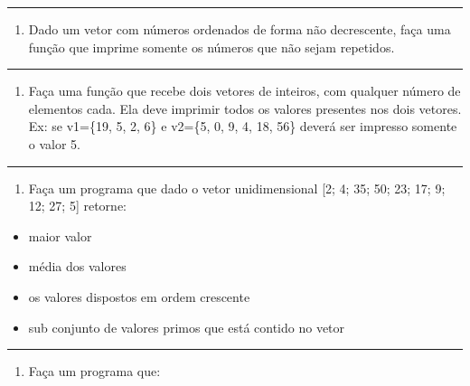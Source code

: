 \documentclass[12pt,a4paper]{article}
\renewcommand{\linethickness}{0.05em}
\providecommand{\tightlist}{%
      \setlength{\itemsep}{0pt}\setlength{\parskip}{0pt}}
\begin{document}
    \begin{center}\rule{0.5\linewidth}{\linethickness}\end{center}

\begin{enumerate}
\def\labelenumi{\arabic{enumi}.}
\setcounter{enumi}{13}
\tightlist
\item
  Dado um vetor com números ordenados de forma não decrescente, faça uma
  função que imprime somente os números que não sejam repetidos.
\end{enumerate}

    \begin{center}\rule{0.5\linewidth}{\linethickness}\end{center}

\begin{enumerate}
\def\labelenumi{\arabic{enumi}.}
\setcounter{enumi}{14}
\tightlist
\item
  Faça uma função que recebe dois vetores de inteiros, com qualquer
  número de elementos cada. Ela deve imprimir todos os valores presentes
  nos dois vetores. Ex: se v1=\{19, 5, 2, 6\} e v2=\{5, 0, 9, 4, 18,
  56\} deverá ser impresso somente o valor 5.
\end{enumerate}

    \begin{center}\rule{0.5\linewidth}{\linethickness}\end{center}

\begin{enumerate}
\def\labelenumi{\arabic{enumi}.}
\setcounter{enumi}{15}
\tightlist
\item
  Faça um programa que dado o vetor unidimensional {[}2; 4; 35; 50; 23;
  17; 9; 12; 27; 5{]} retorne:\\
\end{enumerate}

\begin{itemize}
\tightlist
\item
  maior valor
\item
  média dos valores
\item
  os valores dispostos em ordem crescente
\item
  sub conjunto de valores primos que está contido no vetor
\end{itemize}

    \begin{center}\rule{0.5\linewidth}{\linethickness}\end{center}

\begin{enumerate}
\def\labelenumi{\arabic{enumi}.}
\setcounter{enumi}{16}
\tightlist
\item
  Faça um programa que:
\end{enumerate}
\end{document}
